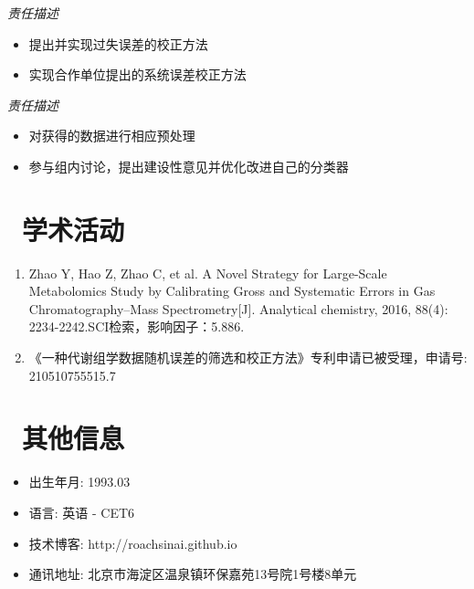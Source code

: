 \documentclass{resume}
\begin{document}
\emph{责任描述}
\begin{itemize}
  \item 提出并实现过失误差的校正方法
  \item 实现合作单位提出的系统误差校正方法
\end{itemize}

\emph{责任描述}
\begin{itemize}
  \item 对获得的数据进行相应预处理
  \item 参与组内讨论，提出建设性意见并优化改进自己的分类器
\end{itemize}

\section{\faUniversity\ 学术活动}
\begin{enumerate}[parsep=0.5ex]
  \item Zhao Y, Hao Z, Zhao C, et al. A Novel Strategy for Large-Scale Metabolomics Study by Calibrating Gross and Systematic Errors in Gas Chromatography–Mass Spectrometry[J]. Analytical chemistry, 2016, 88(4): 2234-2242.SCI检索，影响因子：5.886.
  \item 《一种代谢组学数据随机误差的筛选和校正方法》专利申请已被受理，申请号: 210510755515.7
\end{enumerate}

\section{\faInfo\ 其他信息}
\begin{itemize}[parsep=0.5ex]
  \item 出生年月: 1993.03
  \item 语\hspace{2em}言: 英语 - CET6
  \item 技术博客: http://roachsinai.github.io
  \item 通讯地址: 北京市海淀区温泉镇环保嘉苑13号院1号楼8单元 
\end{itemize}
\end{document}
